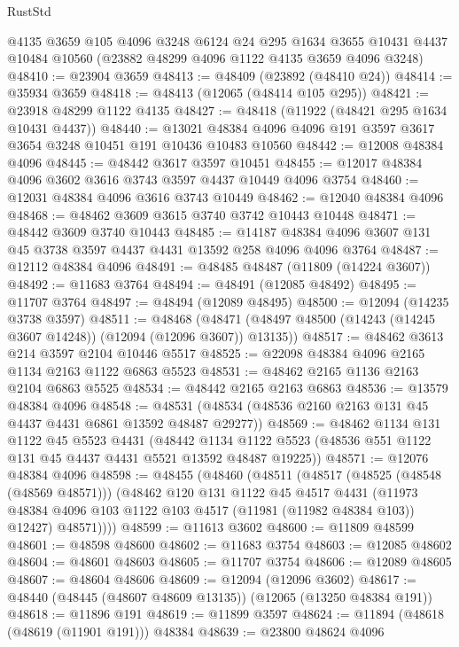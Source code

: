 \begin{lexlean}{RustStd}
\begin{coremodule}
    @4135
    @3659
    @105
    @4096
    @3248
    @6124
    @24
    @295
    @1634
    @3655
    @10431
    @4437
    @10484
    @10560
    (@23882 @48299 @4096 @1122 @4135 @3659 @4096 @3248)
@48410 := @23904 @3659
@48413 := @48409 (@23892 (@48410 @24))
@48414 := @35934 @3659
@48418 := @48413 (@12065 (@48414 @105 @295))
@48421 := @23918 @48299 @1122 @4135
@48427 := @48418 (@11922 (@48421 @295 @1634 @10431 @4437))
@48440 := @13021 @48384 @4096 @4096 @191 @3597 @3617 @3654 @3248 @10451 @191 @10436 @10483 @10560
@48442 := @12008 @48384 @4096
@48445 := @48442 @3617 @3597 @10451
@48455 := @12017 @48384 @4096 @3602 @3616 @3743 @3597 @4437 @10449 @4096 @3754
@48460 := @12031 @48384 @4096 @3616 @3743 @10449
@48462 := @12040 @48384 @4096
@48468 := @48462 @3609 @3615 @3740 @3742 @10443 @10448
@48471 := @48442 @3609 @3740 @10443
@48485 := @14187 @48384 @4096 @3607 @131 @45 @3738 @3597 @4437 @4431 @13592 @258 @4096 @4096 @3764
@48487 := @12112 @48384 @4096
@48491 := @48485 @48487 (@11809 (@14224 @3607))
@48492 := @11683 @3764
@48494 := @48491 (@12085 @48492)
@48495 := @11707 @3764
@48497 := @48494 (@12089 @48495)
@48500 := @12094 (@14235 @3738 @3597)
@48511 := @48468
    (@48471 (@48497 @48500 (@14243 (@14245 @3607 @14248)) (@12094 (@12096 @3607)) @13135))
@48517 := @48462 @3613 @214 @3597 @2104 @10446 @5517
@48525 := @22098 @48384 @4096 @2165 @1134 @2163 @1122 @6863 @5523
@48531 := @48462 @2165 @1136 @2163 @2104 @6863 @5525
@48534 := @48442 @2165 @2163 @6863
@48536 := @13579 @48384 @4096
@48548 := @48531 (@48534 (@48536 @2160 @2163 @131 @45 @4437 @4431 @6861 @13592 @48487 @29277))
@48569 := @48462
    @1134
    @131
    @1122
    @45
    @5523
    @4431
    (@48442 @1134 @1122 @5523 (@48536 @551 @1122 @131 @45 @4437 @4431 @5521 @13592 @48487 @19225))
@48571 := @12076 @48384 @4096
@48598 := @48455
    (@48460
      (@48511
        (@48517
          (@48525 (@48548 (@48569 @48571)))
          (@48462
            @120
            @131
            @1122
            @45
            @4517
            @4431
            (@11973 @48384 @4096 @103 @1122 @103 @4517 (@11981 (@11982 @48384 @103)) @12427)
            @48571))))
@48599 := @11613 @3602
@48600 := @11809 @48599
@48601 := @48598 @48600
@48602 := @11683 @3754
@48603 := @12085 @48602
@48604 := @48601 @48603
@48605 := @11707 @3754
@48606 := @12089 @48605
@48607 := @48604 @48606
@48609 := @12094 (@12096 @3602)
@48617 := @48440 (@48445 (@48607 @48609 @13135)) (@12065 (@13250 @48384 @191))
@48618 := @11896 @191
@48619 := @11899 @3597
@48624 := @11894 (@48618 (@48619 (@11901 @191))) @48384
@48639 := @23800
    @48624
    @4096

\end{coremodule}
\end{lexlean}
